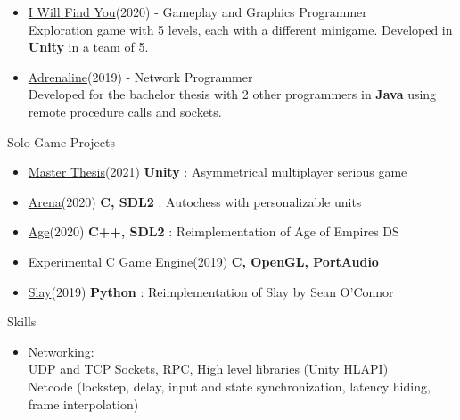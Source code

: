 \documentclass[10pt]{article}
\begin{document}
{\begin{itemize}
\item \textcolor{coolred} { \href{https://polimi-game-collective.itch.io/i-will-find-you} {I Will Find You}}(2020) - Gameplay and Graphics Programmer \\
	Exploration game with 5 levels, each with a different minigame.
		Developed in \textbf{Unity} in a team of 5.

\item \textcolor{coolred} { \href{https://github.com/Astervista/ing-sw-2019-Fiora-Gatta-Grandi} {Adrenaline}}(2019) - Network Programmer \\
		Developed for the bachelor thesis with 2 other programmers in \textbf{Java} using remote procedure calls and sockets.

\end{itemize}

\vspace{0.2in}

\begin{Large} \textcolor{coolorange} { Solo Game Projects } \end{Large}
\begin{itemize}
	\item \textcolor{coolred} { \href{https://github.com/jacopograndi/radio} { Master Thesis}}(2021) \textbf{Unity}
		: Asymmetrical multiplayer serious game
	\item \textcolor{coolred} { \href{https://github.com/jacopograndi/arena} { Arena}}(2020) \textbf{C, SDL2}
		: Autochess with personalizable units
	\item \textcolor{coolred} { \href{https://github.com/jacopograndi/age} { Age}}(2020) \textbf{C++, SDL2}
		: Reimplementation of Age of Empires DS
	\item \textcolor{coolred} { \href{https://github.com/jacopograndi/td} { Experimental C Game Engine}}(2019) \textbf{C, OpenGL, PortAudio}
	\item \textcolor{coolred} { \href{https://github.com/jacopograndi/slay2} { Slay}}(2019) \textbf{Python}
		: Reimplementation of Slay by Sean O'Connor

\end{itemize}

\vspace{0.2in}

\begin{Large} \textcolor{coolorange} { Skills } \end{Large}
\begin{itemize}
	\item \textcolor{coolred} {Networking:} \\
	UDP and TCP Sockets, RPC, High level libraries (Unity HLAPI) \\
	Netcode (lockstep, delay, input and state synchronization, latency hiding, frame interpolation)


\end{itemize}}
\end{document}
